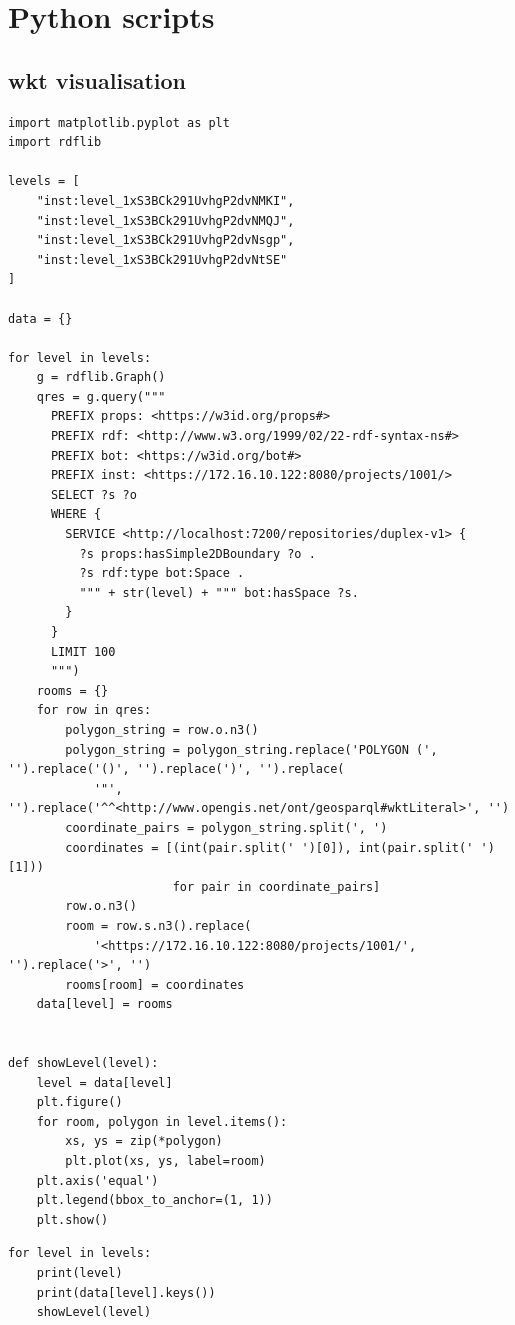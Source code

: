 \chapter{Python scripts}

\section{\acs{wkt} visualisation}
\label{sec:wktVisualisation}
\begin{verbatim}
import matplotlib.pyplot as plt
import rdflib

levels = [
    "inst:level_1xS3BCk291UvhgP2dvNMKI",
    "inst:level_1xS3BCk291UvhgP2dvNMQJ",
    "inst:level_1xS3BCk291UvhgP2dvNsgp",
    "inst:level_1xS3BCk291UvhgP2dvNtSE"
]

data = {}

for level in levels:
    g = rdflib.Graph()
    qres = g.query("""
      PREFIX props: <https://w3id.org/props#>
      PREFIX rdf: <http://www.w3.org/1999/02/22-rdf-syntax-ns#>
      PREFIX bot: <https://w3id.org/bot#>
      PREFIX inst: <https://172.16.10.122:8080/projects/1001/>
      SELECT ?s ?o
      WHERE {
        SERVICE <http://localhost:7200/repositories/duplex-v1> {
          ?s props:hasSimple2DBoundary ?o .
          ?s rdf:type bot:Space .
          """ + str(level) + """ bot:hasSpace ?s.
        }
      }
      LIMIT 100
      """)
    rooms = {}
    for row in qres:
        polygon_string = row.o.n3()
        polygon_string = polygon_string.replace('POLYGON (', '').replace('()', '').replace(')', '').replace(
            '"', '').replace('^^<http://www.opengis.net/ont/geosparql#wktLiteral>', '')
        coordinate_pairs = polygon_string.split(', ')
        coordinates = [(int(pair.split(' ')[0]), int(pair.split(' ')[1]))
                       for pair in coordinate_pairs]
        row.o.n3()
        room = row.s.n3().replace(
            '<https://172.16.10.122:8080/projects/1001/', '').replace('>', '')
        rooms[room] = coordinates
    data[level] = rooms


def showLevel(level):
    level = data[level]
    plt.figure()
    for room, polygon in level.items():
        xs, ys = zip(*polygon)
        plt.plot(xs, ys, label=room)
    plt.axis('equal')
    plt.legend(bbox_to_anchor=(1, 1))
    plt.show()
\end{verbatim}

\begin{verbatim}
for level in levels:
    print(level)
    print(data[level].keys())
    showLevel(level)
\end{verbatim}

